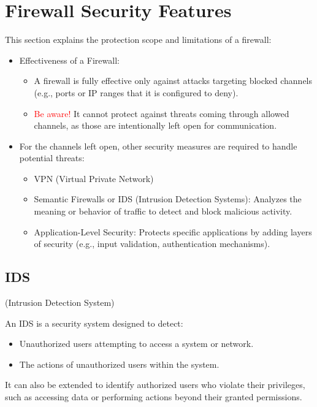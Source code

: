 \section{Firewall Security Features}
This section explains the protection scope and limitations of a firewall:
\begin{itemize}
    \item Effectiveness of a Firewall:
    \begin{itemize}
        \item A firewall is fully effective only against attacks targeting blocked channels (e.g., ports or IP ranges that it is configured to deny).
        \item \textcolor{Red}{Be aware! }It cannot protect against threats coming through allowed channels, as those are intentionally left open for communication.
    \end{itemize}
    \item For the channels left open, other security measures are required to handle potential threats:
    \begin{itemize}
        \item VPN (Virtual Private Network)
        \item Semantic Firewalls or IDS (Intrusion Detection Systems): Analyzes the meaning or behavior of traffic to detect and block malicious activity.
        \item Application-Level Security: Protects specific applications by adding layers of security (e.g., input validation, authentication mechanisms).
    \end{itemize}
\end{itemize}

\subsection{IDS}
\begin{center}
    (Intrusion Detection System)
\end{center}

An IDS is a security system designed to detect:
\begin{itemize}
    \item Unauthorized users attempting to access a system or network.
    \item The actions of unauthorized users within the system.
\end{itemize}

It can also be extended to identify authorized users who violate their privileges, such as accessing data or performing actions beyond their granted permissions.

